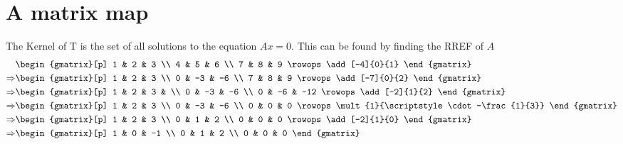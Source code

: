 \section{A matrix map}
The Kernel of T is the set of all solutions to the equation $Ax = 0$.
This can be found by finding the RREF of $A$
\begin{align*}
    & \begin{gmatrix}[p]
        1 & 2 & 3 \\
        4 & 5 & 6 \\
        7 & 8 & 9 
        \rowops
        \add[-4]{0}{1}
      \end{gmatrix} \\
    \Rightarrow 
    & \begin{gmatrix}[p]
        1 & 2 & 3 \\
        0 & -3 & -6 \\
        7 & 8 & 9 
        \rowops
        \add[-7]{0}{2}
      \end{gmatrix} \\
    \Rightarrow 
    & \begin{gmatrix}[p]
        1 & 2 & 3 & \\
        0 & -3 & -6 \\
        0 & -6 & -12 
        \rowops
        \add[-2]{1}{2}
      \end{gmatrix} \\
    \Rightarrow 
    & \begin{gmatrix}[p]
        1 & 2 & 3 \\
        0 & -3 & -6 \\
        0 & 0 & 0 
        \rowops
        \mult{1}{\scriptstyle \cdot -\frac{1}{3}}
      \end{gmatrix} \\
    \Rightarrow 
    & \begin{gmatrix}[p]
        1 & 2 & 3 \\
        0 & 1 & 2 \\
        0 & 0 & 0 
        \rowops
        \add[-2]{1}{0}
      \end{gmatrix} \\
    \Rightarrow 
    & \begin{gmatrix}[p]
        1 & 0 & -1 \\
        0 & 1 & 2 \\
        0 & 0 & 0 
      \end{gmatrix} \\
\end{align*}

